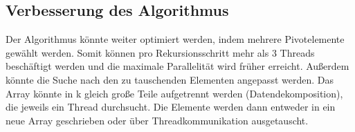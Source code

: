 \documentclass[12pt,a4paper]{article}
\begin{document}
\subsection{Verbesserung des Algorithmus}
Der Algorithmus könnte weiter optimiert werden, indem mehrere Pivotelemente gewählt werden. Somit können pro Rekursionsschritt mehr als 3 Threads beschäftigt werden und die maximale Parallelität wird früher erreicht. Außerdem könnte die Suche nach den zu tauschenden Elementen angepasst werden. Das Array könnte in k gleich große Teile aufgetrennt werden (Datendekomposition), die jeweils ein Thread durchsucht. Die Elemente werden dann entweder in ein neue Array geschrieben oder über Threadkommunikation ausgetauscht.
\end{document}
